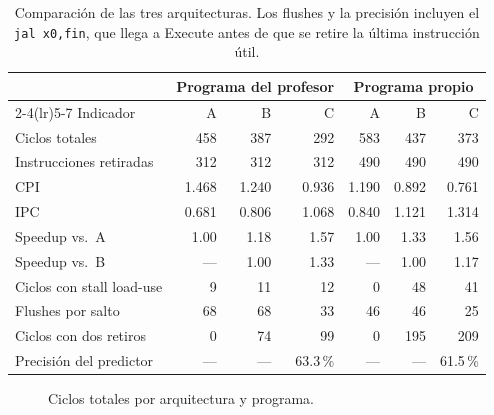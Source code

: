 \documentclass[11pt,a4paper]{article}
\newcommand{\sig}[1]{\texttt{#1}}
\begin{document}
\begin{table}[H]
\centering
\small
\begin{tabular}{lrrr@{\hspace{18pt}}rrr}
\toprule
 & \multicolumn{3}{c}{Programa del profesor} & \multicolumn{3}{c}{Programa propio} \\
\cmidrule(lr){2-4}\cmidrule(lr){5-7}
Indicador & A & B & C & A & B & C \\
\midrule
Ciclos totales & 458 & 387 & 292 & 583 & 437 & 373 \\
Instrucciones retiradas & 312 & 312 & 312 & 490 & 490 & 490 \\
CPI & 1.468 & 1.240 & 0.936 & 1.190 & 0.892 & 0.761 \\
IPC & 0.681 & 0.806 & 1.068 & 0.840 & 1.121 & 1.314 \\
Speedup vs.\ A & 1.00 & 1.18 & 1.57 & 1.00 & 1.33 & 1.56 \\
Speedup vs.\ B & — & 1.00 & 1.33 & — & 1.00 & 1.17 \\
\midrule
Ciclos con stall load-use & 9 & 11 & 12 & 0 & 48 & 41 \\
Flushes por salto & 68 & 68 & 33 & 46 & 46 & 25 \\
Ciclos con dos retiros & 0 & 74 & 99 & 0 & 195 & 209 \\
Precisión del predictor & — & — & 63.3\,\% & — & — & 61.5\,\% \\
\bottomrule
\end{tabular}
\caption{Comparación de las tres arquitecturas. Los flushes y la precisión incluyen el \sig{jal x0,fin}, que llega a Execute antes de que se retire la última instrucción útil.}
\label{tab:comparacion}
\end{table}

\begin{figure}[H]
\centering
{}
\caption{Ciclos totales por arquitectura y programa.}
\end{figure}
\end{document}
